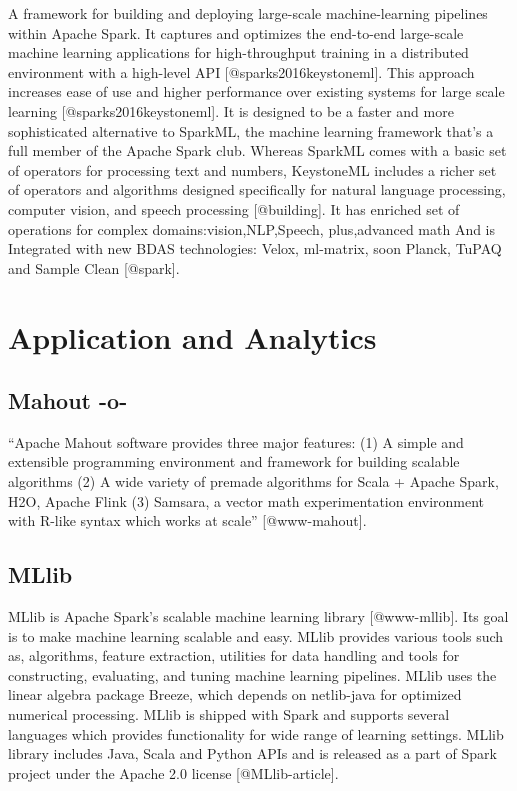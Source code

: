 A framework for building and deploying large-scale machine-learning
pipelines within Apache Spark. It captures and optimizes the
end-to-end large-scale machine learning applications for
high-throughput training in a distributed environment with a
high-level API [@sparks2016keystoneml]. This approach increases
ease of use and higher performance over existing systems for large
scale learning [@sparks2016keystoneml]. It is designed to be a
faster and more sophisticated alternative to SparkML, the machine
learning framework that's a full member of the Apache Spark
club. Whereas SparkML comes with a basic set of operators for
processing text and numbers, KeystoneML includes a richer set of
operators and algorithms designed specifically for natural language
processing, computer vision, and speech processing [@building]. It
has enriched set of operations for complex domains:vision,NLP,Speech,
plus,advanced math And is Integrated with new BDAS technologies:
Velox, ml-matrix, soon Planck, TuPAQ and Sample Clean [@spark].

\section{Application and Analytics}

\subsection{Mahout -o-}

``Apache Mahout software provides three major features: (1) A simple
and extensible programming environment and framework for building
scalable algorithms (2) A wide variety of premade algorithms for Scala
+ Apache Spark, H2O, Apache Flink (3) Samsara, a vector math
experimentation environment with R-like syntax which works at
scale'' [@www-mahout].




\subsection{MLlib}

MLlib is Apache Spark's scalable machine learning
library [@www-mllib]. Its goal is to make machine learning
scalable and easy. MLlib provides various tools such as, algorithms,
feature extraction, utilities for data handling and tools for
constructing, evaluating, and tuning machine learning pipelines. MLlib
uses the linear algebra package Breeze, which depends on netlib-java
for optimized numerical processing. MLlib is shipped with Spark and
supports several languages which provides functionality for wide range
of learning settings. MLlib library includes Java, Scala and Python
APIs and is released as a part of Spark project under the Apache 2.0
license [@MLlib-article].

